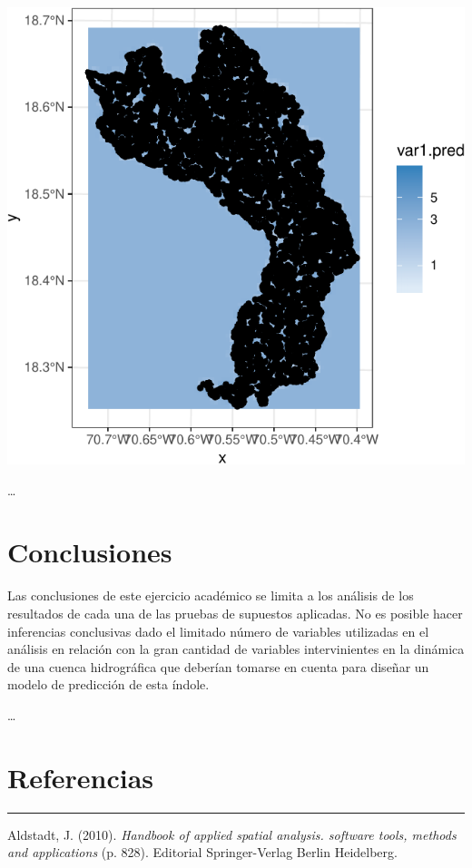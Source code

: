 \documentclass[11pt,]{article}
\begin{document}
\includegraphics{proyecto_f_files/figure-latex/unnamed-chunk-99-2.pdf}

\ldots

\section{Conclusiones}\label{conclusiones}

Las conclusiones de este ejercicio académico se limita a los análisis de
los resultados de cada una de las pruebas de supuestos aplicadas. No es
posible hacer inferencias conclusivas dado el limitado número de
variables utilizadas en el análisis en relación con la gran cantidad de
variables intervinientes en la dinámica de una cuenca hidrográfica que
deberían tomarse en cuenta para diseñar un modelo de predicción de esta
índole.

\ldots

\section{Referencias}\label{referencias}

\begin{center}\rule{0.5\linewidth}{\linethickness}\end{center}

\hypertarget{refs}{}
\hypertarget{ref-SpatialClustering}{}
Aldstadt, J. (2010). \emph{Handbook of applied spatial analysis.
software tools, methods and applications} (p. 828). Editorial
Springer-Verlag Berlin Heidelberg.
\end{document}
